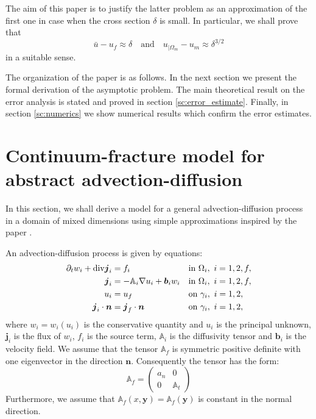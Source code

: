 \documentclass[a4paper]{article}
\def\prtl{\partial}
\def\vc#1{\mathbf{\boldsymbol{#1}}}     %
\def\tn#1{{\mathbb{#1}}}    %
\def\div{{\rm div}}
\def\grad{\nabla}
\begin{document}
The aim of this paper is to justify the latter problem as an approximation of the first one in case when the cross section $\delta$ is small.
In particular, we shall prove that
\[ \bar u - u_f \approx \delta\quad\mbox{and}\quad u_{|\Omega_m}-u_m \approx \delta^{3/2} \]
in a suitable sense.

The organization of the paper is as follows.
In the next section we present the formal derivation of the asymptotic problem.
The main theoretical result on the error analysis is stated and proved in section \ref{sc:error_estimate}.
Finally, in section \ref{sc:numerics} we show numerical results which confirm the error estimates.






\section{Continuum-fracture model for abstract advection-diffusion}
\label{sc:ad_on_fractures}
In this section, we shall derive a model for a general advection-diffusion process in a domain of mixed dimensions using
simple approximations inspired by the paper \citet{martin_modeling_2005}.

An advection-diffusion process is given by equations:
\begin{align}
  \label{eq:fr:continuity}
  \prtl_t w_i + \div \vc j_i &= f_i&&  \text{in } \Omega_i,\ i=1,2,f,\\
  \label{eq:fr:flux}
  \vc j_i &= - \tn A_i\grad u_i + \vc b_i w_i&& \text{in } \Omega_i,\ i=1,2,f,\\
  \label{eq:fr:Dirichlet}
  u_i &= u_f&& \text{on } \gamma_i,\ i=1,2,\\
  \label{eq:fr:Neumann}
  \vc j_i \cdot \vc n &= \vc j_f \cdot \vc n&& \text{on } \gamma_i,\ i=1,2,
\end{align}
where $w_i=w_i(u_i)$ is the conservative quantity and $u_i$ is the principal unknown, $\vc j_i$ is the flux of $w_i$, $f_i$ is the source term,
$\tn A_i$ is the diffusivity tensor and $\vc b_i$ is the velocity field. We assume that the tensor $\tn A_f$ is symmetric positive definite 
with one eigenvector in the direction $\vc n$. Consequently the tensor has the form:
\[
 \tn A_f = \begin{pmatrix} 
            a_n & 0  \\
            0 & \tn A_t
       \end{pmatrix}
\]
Furthermore, we assume that $\tn A_f(x, \vc y)=\tn A_f(\vc y)$ is constant in the normal direction.
\end{document}
